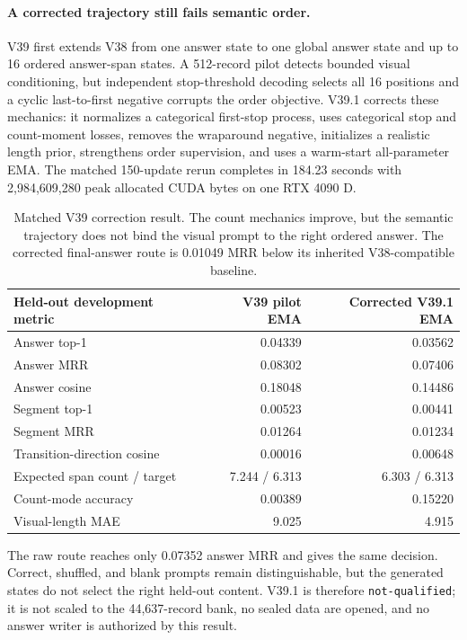 \documentclass[11pt]{article}
\begin{document}
\paragraph{A corrected trajectory still fails semantic order.}
V39 first extends V38 from one answer state to one global answer state and up to
16 ordered answer-span states. A 512-record pilot detects bounded visual
conditioning, but independent stop-threshold decoding selects all 16 positions
and a cyclic last-to-first negative corrupts the order objective. V39.1 corrects
these mechanics: it normalizes a categorical first-stop process, uses
categorical stop and count-moment losses, removes the wraparound negative,
initializes a realistic length prior, strengthens order supervision, and uses a
warm-start all-parameter EMA. The matched 150-update rerun completes in 184.23
seconds with 2,984,609,280 peak allocated CUDA bytes on one RTX 4090 D.

\begin{table}[h!]
\centering
\small
\begin{tabular}{lrr}
\toprule
Held-out development metric & V39 pilot EMA & Corrected V39.1 EMA \\
\midrule
Answer top-1 & 0.04339 & 0.03562 \\
Answer MRR & 0.08302 & 0.07406 \\
Answer cosine & 0.18048 & 0.14486 \\
Segment top-1 & 0.00523 & 0.00441 \\
Segment MRR & 0.01264 & 0.01234 \\
Transition-direction cosine & 0.00016 & 0.00648 \\
Expected span count / target & 7.244 / 6.313 & 6.303 / 6.313 \\
Count-mode accuracy & 0.00389 & 0.15220 \\
Visual-length MAE & 9.025 & 4.915 \\
\bottomrule
\end{tabular}
\caption{Matched V39 correction result. The count mechanics improve, but the
semantic trajectory does not bind the visual prompt to the right ordered
answer. The corrected final-answer route is 0.01049 MRR below its inherited
V38-compatible baseline.}
\label{tab:v39correction}
\end{table}

The raw route reaches only 0.07352 answer MRR and gives the same decision.
Correct, shuffled, and blank prompts remain distinguishable, but the generated
states do not select the right held-out content. V39.1 is therefore
\texttt{not-qualified}; it is not scaled to the 44,637-record bank, no sealed
data are opened, and no answer writer is authorized by this result.
\end{document}
